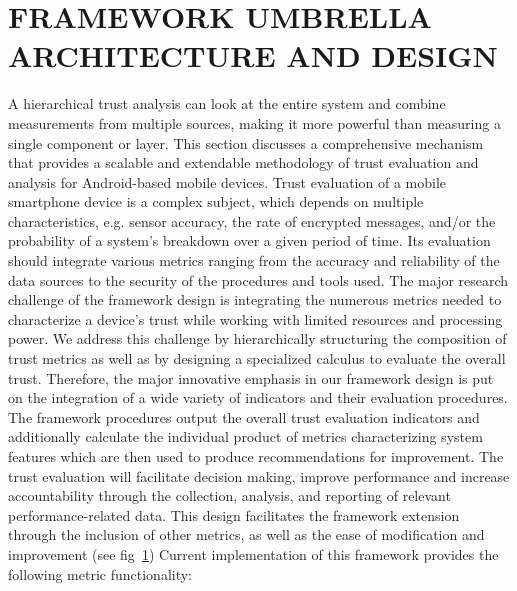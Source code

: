 \section{FRAMEWORK UMBRELLA ARCHITECTURE AND DESIGN}

A hierarchical trust analysis can look at the entire system and combine measurements from multiple sources, making
it more powerful than measuring a single component or layer.
This section discusses a comprehensive mechanism that provides a scalable and extendable methodology of trust
 evaluation and analysis for Android-based mobile devices. 
Trust evaluation of a mobile smartphone device is a complex subject, which depends on multiple characteristics, 
e.g. sensor accuracy, the rate of encrypted messages, and/or the probability of a system's breakdown over a given period of time. Its evaluation should integrate various metrics ranging from the accuracy and reliability of the data sources to the security of the procedures and tools used. The major research challenge of the framework design is integrating the numerous metrics needed to characterize a device's trust while working with limited resources and processing power. 
We address this challenge by hierarchically structuring the composition of trust metrics as well as by designing a specialized calculus to evaluate the overall trust. 
Therefore, the major innovative emphasis in our framework design is put on the integration of a wide variety of indicators and their evaluation procedures. The framework procedures output the overall trust evaluation indicators and additionally calculate the individual product of metrics characterizing system features which are then used to produce recommendations for improvement. The trust evaluation will facilitate decision making, improve performance and increase accountability through the collection, analysis, and reporting of relevant performance-related data. This design facilitates the framework extension through
 the inclusion of other metrics, as well as the ease of modification and improvement (see fig~\ref{})
Current implementation of this framework provides the following metric functionality: 

